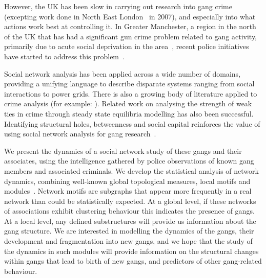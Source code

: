 \documentclass[twocolumn]{svjour3}          %
\theoremstyle{definition}
\begin{document}
However, the UK has been slow in carrying out research into gang crime
(excepting work done in North East London~\cite{pitts:2007} in 2007),
and especially into what actions work best at controlling it. In
Greater Manchester, a region in the north of the UK that has had a
significant gun crime problem related to gang activity, primarily due
to acute social deprivation in the
area~\citep{BBCNews2003,BBCNews2004,HalesLewisSilverstone2006}, recent
police initiatives have started to address this
problem~\citep{BBCNews2010}.

Social network analysis has been applied across a wide number of
domains, providing a unifying language to describe disparate systems
ranging from social interactions to power grids. There is also a
growing body of literature applied to crime analysis (for example:
\citep{BaronTindall1993,Klerks2001,Hansen2005,OatleyZeleznikowLearyEwart2005,OatleyEwartZeleznikow2006,CalvoArmengolZenou2006,HutchinsBenhamHutchins2009}).
Related work \citep{CalvoArmengolVerdierZenou2007,PatacchiniZenou2008} on analysing
the strength of weak ties in crime through steady state equilibria
modelling has also been successful. Identifying structural holes,
betweenness and social capital reinforces the value of using social
network analysis for gang research~\citep{papachristos:2006}.

We present the dynamics of a social network study of these gangs and
their associates, using the intelligence gathered by police
observations of known gang members and associated criminals. We
develop the statistical analysis of network dynamics, combining
well-known global topological measures, local motifs and
modules~\citep{CostaRodriguesTraviesoVillasBoas2007,Jackson2008,Newman2003}.
Network motifs are subgraphs that appear more frequently in a real
network than could be statistically expected. At a global level, if
these networks of associations exhibit clustering behaviour this
indicates the presence of gangs. At a local level, any defined
substructures will provide us information about the gang structure. We
are interested in modelling the dynamics of the gangs, their
development and fragmentation into new gangs, and we hope that the
study of the dynamics in such modules will provide information on the
structural changes within gangs that lead to birth of new gangs, and
predictors of other gang-related behaviour.
\end{document}
